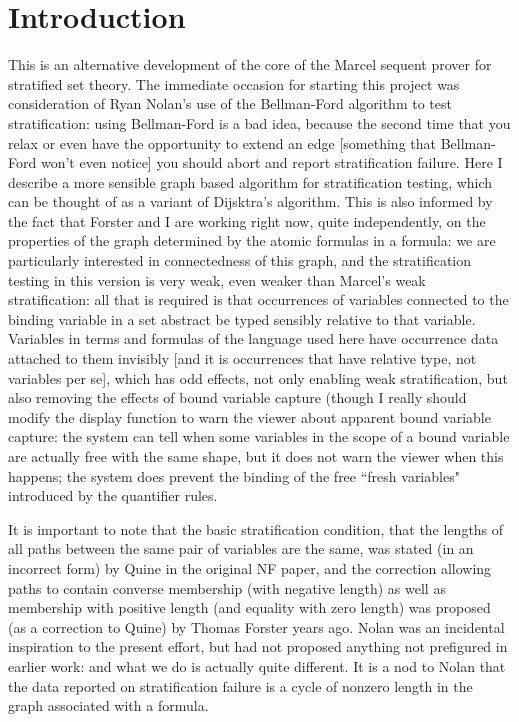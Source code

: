 \documentclass{article}
\begin{document}
 \section{Introduction}

 This is an alternative development of the core of the Marcel sequent prover
 for stratified set theory.  The immediate occasion for starting this project was consideration of 
 Ryan Nolan's use of the Bellman-Ford algorithm to test stratification:
 using Bellman-Ford is a bad idea, because the second time that you relax
 or even have the opportunity to extend an edge
 [something that Bellman-Ford won't even notice] you should abort and report
 stratification failure.  Here I describe a more sensible graph based
 algorithm for stratification testing, which can be thought of as a variant
 of Dijsktra's algorithm.  This is also informed by the fact that Forster
 and I are working right now, quite independently, on the properties
 of the graph determined by the atomic formulas in a formula:  we are particularly
 interested in connectedness of this graph, and the stratification
 testing in this version is very weak, even weaker than Marcel's weak stratification:
 all that is required is that occurrences of variables connected to the binding variable
 in a set abstract be typed sensibly relative to that variable.  Variables in
 terms and formulas of the language used here have occurrence data attached
 to them invisibly [and it is occurrences that have relative type, not variables per se],
 which has odd effects, not only enabling weak stratification,
 but also removing the effects of bound variable capture (though I really should
 modify the display function to warn the viewer about apparent bound variable capture:
 the system can tell when some variables in the scope of a bound variable are actually
 free with the same shape, but it does not warn the viewer when this happens;  the
 system does prevent the binding of the free ``fresh variables"
 introduced by the quantifier rules.
 
 It is important to note that the basic stratification condition, that the lengths of all paths between the same pair of variables are the same, was stated (in an incorrect form) by Quine in the original NF paper, and the correction
 allowing paths to contain converse membership (with negative length) as well as membership with positive length
 (and equality with zero length) was proposed (as a correction to Quine) by Thomas Forster years ago.  Nolan was an incidental inspiration to the present effort, but had not proposed anything not prefigured in earlier work:  and what we do is actually quite different.  It is a nod to Nolan that the data reported on stratification failure is a cycle of nonzero length in the graph associated with a formula.
\end{document}

